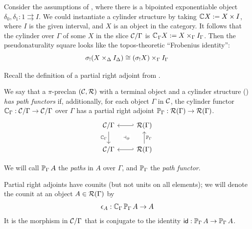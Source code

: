 \begin{example}\label{ex:exponentiable-bipointed}
Consider the assumptions of \cite{awodey2026},
where there is a bipointed exponentiable object
$\delta_0, \delta_1 : 1 \rightrightarrows I$.
We could instantiate a cylinder structure
by taking ${\cyl} X := X \times I$, 
where $I$ is the given interval,
and $X$ is an object in the category.
It follows that the cylinder over $\Gamma$ of some $X$ in the slice
$\CC / \Gamma$ is
${\cyl}_{\Gamma} X := X \times_\Gamma I_\Gamma$.
Then the pseudonaturality square looks like the topos-theoretic ``Frobenius identity'':
\[ \sigma_! (X \times_\Delta I_\Delta) \iso (\sigma_! X) \times_\Gamma I_\Gamma\]
\end{example}


Recall the definition of a partial right adjoint
from .
\begin{definition}\label{def:path-functor}
  We say that a $\pi$-preclan $(\CC,\RR)$ with a terminal object
  and a cylinder structure ()
  \emph{has path functors} if, additionally,
  for each object $\Gamma$ in $\CC$,
  the cylinder functor $\cyl[\Gamma] : \CC / \Gamma \to \CC / \Gamma$ over $\Gamma$
  has a partial right adjoint $\arr[\Gamma] : \RR(\Gamma) \to \RR(\Gamma)$.
  \[\begin{tikzcd}
    {\CC / \Gamma} & {\RR(\Gamma)} \\
    {\CC / \Gamma} & {\RR(\Gamma)}
    \arrow[""{name=0, anchor=center, inner sep=0}, "{\cyl[\Gamma]}"', from=1-1, to=2-1]
    \arrow[hook', from=1-2, to=1-1]
    \arrow[""{name=1, anchor=center, inner sep=0}, "{\arr[\Gamma]}"', from=2-2, to=1-2]
    \arrow[hook', from=2-2, to=2-1]
    \arrow["{{\dashv_\partial}}"{description}, draw=none, from=0, to=1]
  \end{tikzcd}\]
\end{definition}
We will call $\arr[\Gamma] A$ the \emph{paths} in $A$ over $\Gamma$,
and $\arr[\Gamma]$ the \emph{path functor}.

Partial right adjoints have counits (but not units on all elements);
we will denote the counit at an object $A \in \RR(\Gamma)$ by
\[ \epsilon_A : \cyl[\Gamma] \arr[\Gamma]{A} \to A\]
It is the morphism in $\CC / \Gamma$
that is conjugate to the identity $\id : \arr[\Gamma]{A} \to \arr[\Gamma]{A}$.

